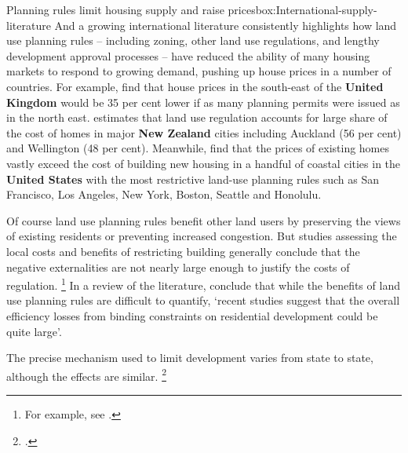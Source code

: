 \begin{bigbox}{Planning rules limit housing supply and raise prices}{box:International-supply-literature}
And a growing international literature consistently highlights how land use planning rules -- including zoning, other land use regulations, and lengthy development approval processes – have reduced the ability of many housing markets to respond to growing demand, pushing up house prices in a number of countries.
For example, \textcite{Hilber-Vermeulen-2015-Supply-constraints-effect-on-English-house-prices} find that house prices in the south-east of the \textbf{United Kingdom} would be 35 per cent lower if as many planning permits were issued as in the north east. \textcite{Lees2017LandRegulation} estimates that land use regulation accounts for large share of the cost of homes in major \textbf{New Zealand} cities including Auckland (56 per cent) and Wellington (48 per cent).  Meanwhile, \textcite{GlaeserGyourko2017EconImplications} find that the prices of existing homes vastly exceed the cost of building new housing in a handful of coastal cities in the \textbf{United States} with the most restrictive land-use planning rules such as San Francisco, Los Angeles, New York, Boston, Seattle and Honolulu.

Of course land use planning rules benefit other land users by preserving the views of existing residents or preventing increased congestion. But studies assessing the local costs and benefits of restricting building generally conclude that the negative externalities are not nearly large enough to justify the costs of regulation.%
    \footnote{For example, see \textcites{Chesire-The-welfare-economics-of-land-use-planning}{Glaeser-Why-is-Manhattan-So-Expensive}{Turner-land-use-regulation-and-welfare}.}
In a review of the literature, \textcite{Gyourko-Molloy-Regulation-and-Housing-Supply} conclude that while the benefits of land use planning rules are difficult to quantify, `recent studies suggest that the overall efficiency losses from binding constraints on residential development could be quite large'.

\end{bigbox}

The precise mechanism used to limit development varies from state to state, although the effects are similar.%
    \footcites[][xxv]{PC2011PerformanceBenchmark}{HsiehEtAlSupply2012}

